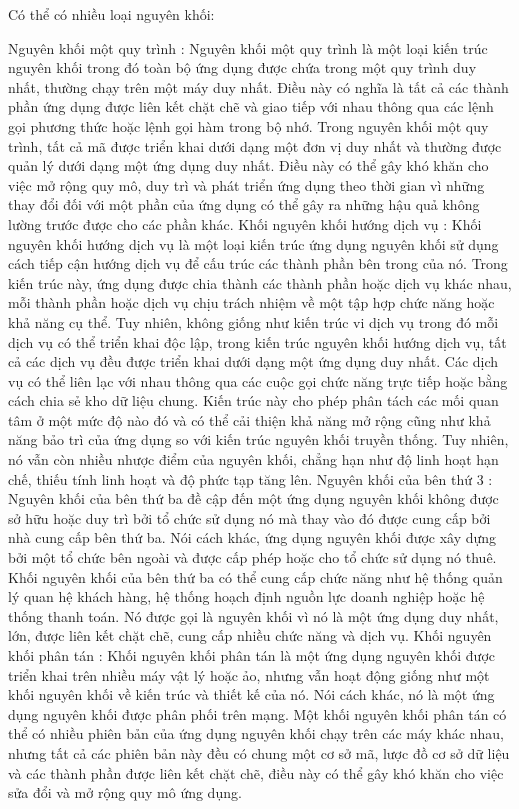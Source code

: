 Có thể có nhiều loại nguyên khối:

Nguyên khối một quy trình : Nguyên khối một quy trình là một loại kiến ​​trúc nguyên khối trong đó toàn bộ ứng dụng được chứa trong một quy trình duy nhất, thường chạy trên một máy duy nhất. Điều này có nghĩa là tất cả các thành phần ứng dụng được liên kết chặt chẽ và giao tiếp với nhau thông qua các lệnh gọi phương thức hoặc lệnh gọi hàm trong bộ nhớ. Trong nguyên khối một quy trình, tất cả mã được triển khai dưới dạng một đơn vị duy nhất và thường được quản lý dưới dạng một ứng dụng duy nhất. Điều này có thể gây khó khăn cho việc mở rộng quy mô, duy trì và phát triển ứng dụng theo thời gian vì những thay đổi đối với một phần của ứng dụng có thể gây ra những hậu quả không lường trước được cho các phần khác.
Khối nguyên khối hướng dịch vụ : Khối nguyên khối hướng dịch vụ là một loại kiến ​​trúc ứng dụng nguyên khối sử dụng cách tiếp cận hướng dịch vụ để cấu trúc các thành phần bên trong của nó. Trong kiến ​​trúc này, ứng dụng được chia thành các thành phần hoặc dịch vụ khác nhau, mỗi thành phần hoặc dịch vụ chịu trách nhiệm về một tập hợp chức năng hoặc khả năng cụ thể. Tuy nhiên, không giống như kiến ​​trúc vi dịch vụ trong đó mỗi dịch vụ có thể triển khai độc lập, trong kiến ​​trúc nguyên khối hướng dịch vụ, tất cả các dịch vụ đều được triển khai dưới dạng một ứng dụng duy nhất. Các dịch vụ có thể liên lạc với nhau thông qua các cuộc gọi chức năng trực tiếp hoặc bằng cách chia sẻ kho dữ liệu chung. Kiến trúc này cho phép phân tách các mối quan tâm ở một mức độ nào đó và có thể cải thiện khả năng mở rộng cũng như khả năng bảo trì của ứng dụng so với kiến ​​trúc nguyên khối truyền thống. Tuy nhiên, nó vẫn còn nhiều nhược điểm của nguyên khối, chẳng hạn như độ linh hoạt hạn chế, thiếu tính linh hoạt và độ phức tạp tăng lên.
Nguyên khối của bên thứ 3 : Nguyên khối của bên thứ ba đề cập đến một ứng dụng nguyên khối không được sở hữu hoặc duy trì bởi tổ chức sử dụng nó mà thay vào đó được cung cấp bởi nhà cung cấp bên thứ ba. Nói cách khác, ứng dụng nguyên khối được xây dựng bởi một tổ chức bên ngoài và được cấp phép hoặc cho tổ chức sử dụng nó thuê. Khối nguyên khối của bên thứ ba có thể cung cấp chức năng như hệ thống quản lý quan hệ khách hàng, hệ thống hoạch định nguồn lực doanh nghiệp hoặc hệ thống thanh toán. Nó được gọi là nguyên khối vì nó là một ứng dụng duy nhất, lớn, được liên kết chặt chẽ, cung cấp nhiều chức năng và dịch vụ.
Khối nguyên khối phân tán : Khối nguyên khối phân tán là một ứng dụng nguyên khối được triển khai trên nhiều máy vật lý hoặc ảo, nhưng vẫn hoạt động giống như một khối nguyên khối về kiến ​​trúc và thiết kế của nó. Nói cách khác, nó là một ứng dụng nguyên khối được phân phối trên mạng. Một khối nguyên khối phân tán có thể có nhiều phiên bản của ứng dụng nguyên khối chạy trên các máy khác nhau, nhưng tất cả các phiên bản này đều có chung một cơ sở mã, lược đồ cơ sở dữ liệu và các thành phần được liên kết chặt chẽ, điều này có thể gây khó khăn cho việc sửa đổi và mở rộng quy mô ứng dụng.
